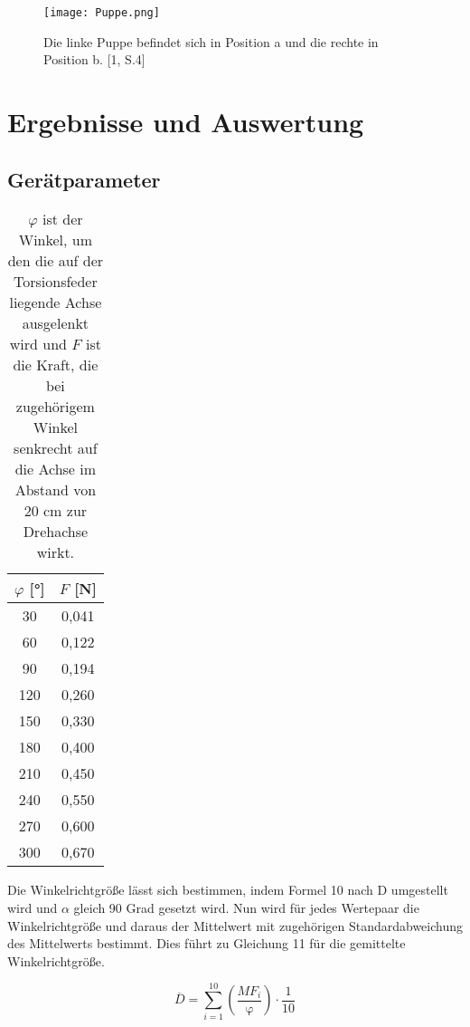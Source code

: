 \documentclass[titlepage = firstcover]{scrartcl}
\begin{document}
      \begin{figure}[h]
        \centering
        \texttt{[image: Puppe.png]}
        \caption{Die linke Puppe befindet sich in Position a und die rechte in Position b. [1, S.4]}
      \end{figure}

    \section{Ergebnisse und Auswertung}

      \subsection{Gerätparameter}
      \begin{table}[h]
        \centering
        \caption{$\varphi$ ist der Winkel, um den die auf der Torsionsfeder liegende Achse ausgelenkt wird und $F$ ist die Kraft, die bei zugehörigem Winkel senkrecht auf die Achse im Abstand von 20 cm zur Drehachse wirkt.}
        \label{tab:Tabelle_1}

        \begin{tabular}{c c}
          \toprule
          {$\varphi$ [°]} & {$F$ [N]} \\
          \midrule
          30 & 0,041 \\
          60 & 0,122 \\
          90 & 0,194 \\
          120 & 0,260 \\
          150 & 0,330 \\
          180 & 0,400 \\
          210 & 0,450 \\
          240 & 0,550 \\
          270 & 0,600 \\
          300 & 0,670 \\
          \bottomrule
        \end{tabular}
      \end{table}
      
      Die Winkelrichtgröße lässt sich bestimmen, indem Formel 10 nach D umgestellt wird und $\alpha$ gleich 90 Grad gesetzt wird. Nun wird für jedes Wertepaar die
      Winkelrichtgröße und daraus der Mittelwert mit zugehörigen Standardabweichung des Mittelwerts bestimmt. Dies führt zu Gleichung 11 für die gemittelte Winkelrichtgröße.

      \begin{equation*}
        \overline{D} = \sum_{i=1}^{10} (\frac{MF_i}{\upvarphi}) \cdot \frac{1}{10}
      \end{equation*}
\end{document}
